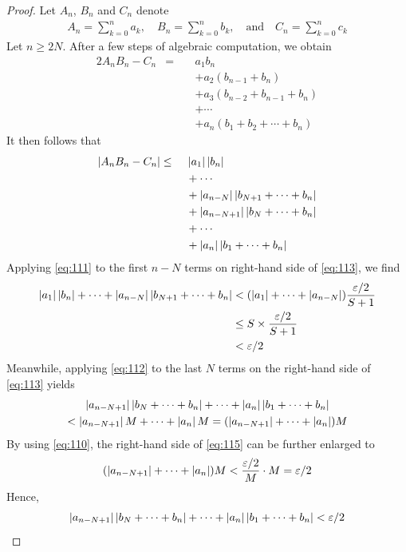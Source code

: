 \documentclass[thmcnt=section, 12pt]{my-elegantbook}
\begin{document}
\begin{proof}
    Let $A_n$, $B_n$ and $C_n$ denote
    \begin{align*}
        A_n = \sum_{k=0}^n a_k,
        \quad
        B_n = \sum_{k=0}^n b_k,
        \quad \text{and} \quad
        C_n = \sum_{k=0}^n c_k
    \end{align*}
    Let $n \geq 2N$. After a few steps of algebraic computation, we obtain 
    \begin{alignat*}{2}
        A_n B_n - C_n
        &=& \; & a_1 b_n \\ 
        &&&+ a_2 (b_{n-1} + b_n) \\
        &&&+ a_3 (b_{n-2} + b_{n-1} + b_n) \\ 
        &&&+ \cdots \\
        &&&+ a_n (b_1 + b_2 + \cdots + b_n)
    \end{alignat*}
    It then follows that 
    \begin{alignat}{2}
        \left\lvert A_n B_n - C_n \right\rvert
        &\leq& \; & \left\lvert a_1 \right\rvert \left\lvert b_n \right\rvert \nonumber \\ 
        &&&+ \cdots \nonumber \\
        &&&+ \left\lvert a_{n-N} \right\rvert \left\lvert b_{N+1} + \cdots + b_n \right\rvert \nonumber \\ 
        &&&+ \left\lvert a_{n-N+1} \right\rvert \left\lvert b_{N} + \cdots + b_n \right\rvert \nonumber \\ 
        &&&+ \cdots \nonumber \\
        &&&+ \left\lvert a_n \right\rvert \left\lvert b_{1} + \cdots + b_n \right\rvert
        \label{eq:113}
    \end{alignat}
    Applying \eqref{eq:111} to the first $n-N$ terms on right-hand side of \eqref{eq:113}, we find 
    \begin{align}
        \left\lvert a_1 \right\rvert\left\lvert b_n \right\rvert 
        + \cdots 
        + \left\lvert a_{n-N} \right\rvert \left\lvert b_{N+1} + \cdots + b_n \right\rvert
        &< (\left\lvert a_1 \right\rvert + \cdots + \left\lvert a_{n-N} \right\rvert) \frac{\varepsilon / 2}{S + 1} \nonumber \\ 
        &\leq S \times \frac{\varepsilon / 2}{S + 1} \nonumber \\ 
        &< \varepsilon / 2 
        \label{eq:114}
    \end{align}
    Meanwhile, applying \eqref{eq:112} to the last $N$ terms on the right-hand side of \eqref{eq:113} yields 
    \begin{multline}
        \left\lvert a_{n-N+1} \right\rvert \left\lvert b_{N} + \cdots + b_n \right\rvert
        + \cdots
        + \left\lvert a_n \right\rvert \left\lvert b_{1} + \cdots + b_n \right\rvert \\
        < \left\lvert a_{n-N+1} \right\rvert M
        + \cdots
        + \left\lvert a_n \right\rvert M
        = (\left\lvert a_{n-N+1} \right\rvert + \cdots + \left\lvert a_n \right\rvert) M
        \label{eq:115}
    \end{multline}
    By using \eqref{eq:110}, the right-hand side of \eqref{eq:115} can be further enlarged to 
    \begin{align*}
        (\left\lvert a_{n-N+1} \right\rvert + \cdots + \left\lvert a_n \right\rvert) M
        < \frac{\varepsilon / 2}{M}
        \cdot M
        = \varepsilon / 2
    \end{align*}
    Hence, 
    \begin{align}
        \left\lvert a_{n-N+1} \right\rvert \left\lvert b_{N} + \cdots + b_n \right\rvert
        + \cdots
        + \left\lvert a_n \right\rvert \left\lvert b_{1} + \cdots + b_n \right\rvert
        < \varepsilon / 2
        \label{eq:116}
    \end{align}
    

\end{proof}
\end{document}
